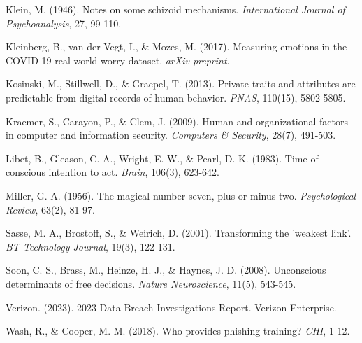 \documentclass[11pt,a4paper]{article}
\begin{document}
\begin{thebibliography}{99}
Klein, M. (1946). Notes on some schizoid mechanisms. \textit{International Journal of Psychoanalysis}, 27, 99-110.

Kleinberg, B., van der Vegt, I., \& Mozes, M. (2017). Measuring emotions in the COVID-19 real world worry dataset. \textit{arXiv preprint}.

Kosinski, M., Stillwell, D., \& Graepel, T. (2013). Private traits and attributes are predictable from digital records of human behavior. \textit{PNAS}, 110(15), 5802-5805.

Kraemer, S., Carayon, P., \& Clem, J. (2009). Human and organizational factors in computer and information security. \textit{Computers \& Security}, 28(7), 491-503.

Libet, B., Gleason, C. A., Wright, E. W., \& Pearl, D. K. (1983). Time of conscious intention to act. \textit{Brain}, 106(3), 623-642.

Miller, G. A. (1956). The magical number seven, plus or minus two. \textit{Psychological Review}, 63(2), 81-97.

Sasse, M. A., Brostoff, S., \& Weirich, D. (2001). Transforming the 'weakest link'. \textit{BT Technology Journal}, 19(3), 122-131.

Soon, C. S., Brass, M., Heinze, H. J., \& Haynes, J. D. (2008). Unconscious determinants of free decisions. \textit{Nature Neuroscience}, 11(5), 543-545.

Verizon. (2023). 2023 Data Breach Investigations Report. Verizon Enterprise.

Wash, R., \& Cooper, M. M. (2018). Who provides phishing training? \textit{CHI}, 1-12.

\end{thebibliography}
\end{document}
